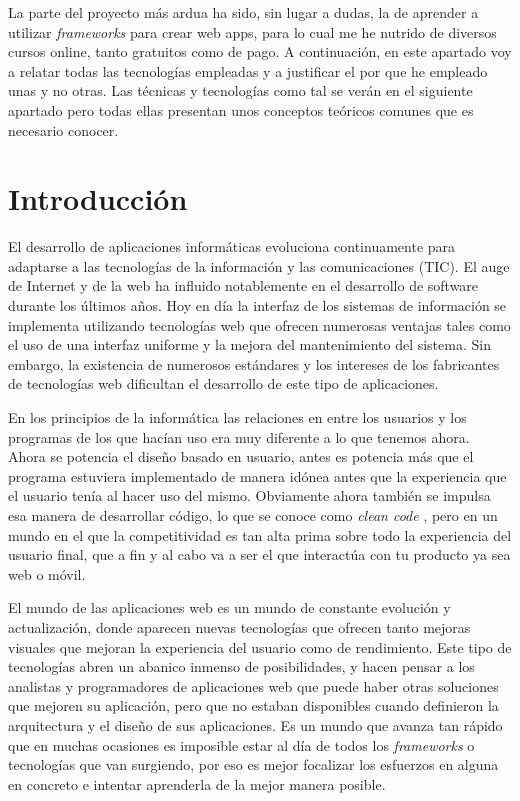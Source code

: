 
La parte del proyecto más ardua ha sido, sin lugar a dudas, la de aprender a utilizar \emph{frameworks}  para crear web apps, para lo cual me he nutrido de diversos cursos online, tanto gratuitos como de pago. A continuación, en este apartado voy a relatar todas las tecnologías empleadas y a justificar el por que he empleado unas y no otras. Las técnicas y tecnologías como tal se verán en el siguiente apartado pero todas ellas presentan unos conceptos teóricos comunes que es necesario conocer. 


\section{Introducción}\label{teorico-introduccion}
El desarrollo de aplicaciones informáticas evoluciona continuamente para adaptarse a las tecnologías de la información y las comunicaciones (TIC). El auge de Internet y de la web ha influido notablemente en el desarrollo de software durante los últimos años. Hoy en día la interfaz de los sistemas de información se implementa utilizando tecnologías web que ofrecen numerosas ventajas tales como el uso de una interfaz uniforme y la mejora del mantenimiento del sistema. Sin embargo, la existencia de numerosos estándares y los intereses de los fabricantes de tecnologías web dificultan el desarrollo de este tipo de aplicaciones. 

En los principios de la informática las relaciones en entre los usuarios y los programas de los que hacían uso era muy diferente a lo que tenemos ahora. Ahora se potencia el diseño basado en usuario, antes es potencia más que el programa estuviera implementado de manera idónea antes que la experiencia que el usuario tenía al hacer uso del mismo. Obviamente ahora también se impulsa esa manera de desarrollar código, lo que se conoce como \emph{clean code} \cite{https://g.co/kgs/VLR4mn}, pero en un mundo en el que la competitividad es tan alta prima sobre todo la experiencia del usuario final, que a fin y al cabo va a ser el que interactúa con tu producto ya sea web o móvil. 




El mundo de las aplicaciones web es un mundo de constante evolución y actualización, donde aparecen nuevas tecnologías que ofrecen tanto mejoras visuales que mejoran la experiencia del usuario como de rendimiento. Este tipo de tecnologías abren un abanico inmenso de posibilidades, y hacen pensar a los analistas y programadores de aplicaciones web que puede haber otras soluciones que mejoren su aplicación, pero que no estaban disponibles cuando definieron la arquitectura y el diseño de sus aplicaciones. Es un mundo que avanza tan rápido que en muchas ocasiones es imposible estar al día de todos los  \emph{frameworks} o tecnologías que van surgiendo, por eso es mejor focalizar los esfuerzos en alguna en concreto e intentar aprenderla de la mejor manera posible. 




